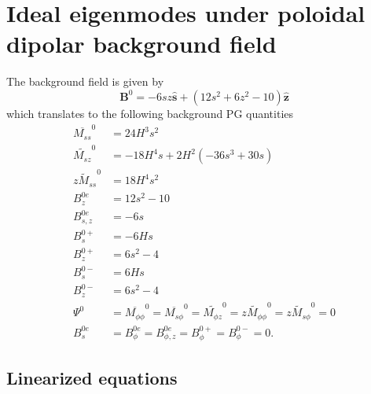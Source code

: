 \section{Ideal eigenmodes under poloidal dipolar background field}

The background field is given by
\[
    \mathbf{B}^0 = -6sz \hat{\mathbf{s}} + (12s^2 + 6z^2 - 10) \hat{\mathbf{z}}
\]
which translates to the following background PG quantities
\begin{equation}
\begin{aligned}
    \overline{M_{ss}}^0 &= 24 H^{3} s^{2} \\ 
    \widetilde{M_{sz}}^0 &= - 18 H^{4} s + 2 H^{2} \left(- 36 s^{3} + 30 s\right) \\
    \widetilde{zM_{ss}}^0 &= 18 H^{4} s^{2} \\
    B_{z}^{0e} &= 12 s^{2} - 10 \\
    B_{s, z}^{0e} &= - 6 s \\
    B_s^{0+} &= - 6 H s \\
    B_z^{0+} &= 6 s^{2} - 4 \\
    B_s^{0-} &= 6 H s \\
    B_z^{0-} &= 6 s^{2} - 4 \\
    \Psi^{0} &= \overline{M_{\phi\phi}}^0 = \overline{M_{s\phi}}^0 = \widetilde{M_{\phi z}}^0 = \widetilde{zM_{\phi\phi}}^0 = \widetilde{zM_{s\phi}}^0 = 0 \\ 
    B_{s}^{0e} &= B_{\phi}^{0e} = B_{\phi, z}^{0e} = B_\phi^{0+} = B_\phi^{0-} = 0.
\end{aligned}
\end{equation}

\subsection{Linearized equations}

